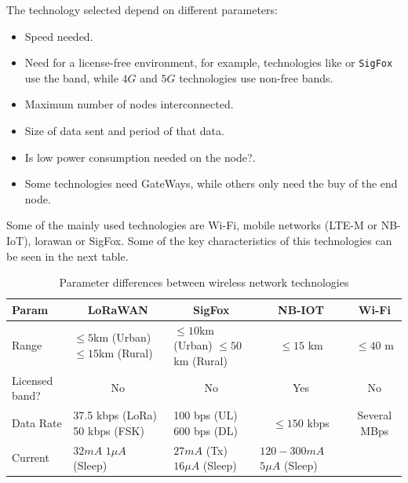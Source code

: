 The technology selected depend on different parameters:
\begin{itemize}
    \item Speed needed.
    \item Need for a license-free environment, for example, technologies like  or \texttt{SigFox} use the  band, while $4G$ and $5G$ technologies use non-free bands.
    \item Maximum number of nodes interconnected.
    \item Size of data sent and period of that data.
    \item Is low power consumption needed on the node?.
    \item Some technologies need GateWays, while others only need the buy of the end node.
\end{itemize}
Some of the mainly used technologies are Wi-Fi, mobile networks (LTE-M or NB-IoT), \acrshort{lorawan} or SigFox. Some of the key characteristics of this technologies can be seen in the next table\cite{IoTSensorNetwork}\cite{surveyLPWAtechnology}\cite{SigfoxEnergyConsumption}.
\begin{table}[H]
    \begin{center}
        \begin{tabular}{p{} |  p{}  p{} p{} p{}}
            \hline
            \textbf{Param} & \multicolumn{1}{c}{\textbf{LoRaWAN}} & \multicolumn{1}{c}{\textbf{SigFox}} & \multicolumn{1}{c}{\textbf{NB-IOT}} & \multicolumn{1}{c}{\textbf{Wi-Fi}}\\
            \hline
            Range & \makecell{$\leq5$km (Urban)\\$\leq15$km (Rural)} & \makecell{$\leq10$km (Urban)\\$\leq50$km (Rural)} & \multicolumn{1}{c}{$\leq15$ km} & \multicolumn{1}{c}{$\leq40$ m}\\
            \hline
            Licensed band? & \multicolumn{1}{c}{No} & \multicolumn{1}{c}{No} & \multicolumn{1}{c}{Yes} & \multicolumn{1}{c}{No}\\
            \hline
            Data Rate & \makecell{37.5 kbps (LoRa) \\ 50 kbps (FSK)} & \makecell{100 bps (UL) \\ 600 bps (DL)} & \multicolumn{1}{c}{$\leq150$ kbps} & \multicolumn{1}{c}{Several MBps}\\
            \hline
            Current & \makecell{$32 mA$ \\ $1 \mu A$ (Sleep)} & \makecell{$27 mA$ (Tx) \\ $16 \mu A$ (Sleep)} & \makecell{$120-300 mA$ \\ $5 \mu A$ (Sleep)} & \\
            \hline
        \end{tabular} 
    \end{center}
    \caption{Parameter differences between wireless network technologies}
    \label{ReqGeneral}
\end{table}

